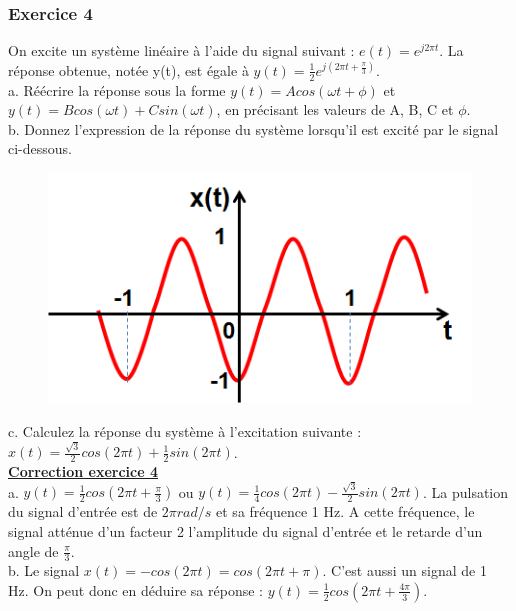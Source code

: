 \documentclass[11pt]{report}
\begin{document}
 	
 	
 	
 	
 	
 	\subsubsection{Exercice 4}
 	
 	On excite un système linéaire à l'aide du signal suivant : $e(t)=e^{j2\pi t}$. La réponse obtenue, notée y(t), est égale à $y(t)=\frac{1}{2}e^{j(2\pi t+\frac{\pi}{3})}$.\\
 	
 	a. Réécrire la réponse sous la forme $y(t)=Acos(\omega t + \phi)$ et $y(t)=Bcos(\omega t)+Csin(\omega t)$, en précisant les valeurs de A, B, C et $\phi$.\\
 	
 	b. Donnez l'expression de la réponse du système lorsqu'il est excité par le signal ci-dessous.
 	
 	\begin{figure}[h!]
 		\centering
 		\includegraphics[scale=0.5]{images/Exo_2_4.png} 
 	\end{figure} 
 	
 	c. Calculez la réponse du système à l'excitation suivante : $x(t)=\frac{\sqrt{3}}{2}cos(2\pi t)+\frac{1}{2}sin(2\pi t)$.\\
 	
 	
 	\textbf{\underline{Correction exercice 4}}\\
 	
 	a. $y(t)=\frac{1}{2}cos(2\pi t+\frac{\pi}{3})$ ou $y(t)=\frac{1}{4}cos(2\pi t)-\frac{\sqrt{3}}{2}sin(2\pi t)$. La pulsation du signal d'entrée est de $2\pi rad/s$ et sa fréquence 1 Hz. A cette fréquence, le signal atténue d'un facteur 2 l'amplitude du signal d'entrée et le retarde d'un angle de $\frac{\pi}{3}$.\\
 	
 	b. Le signal $x(t)=-cos(2\pi t)=cos(2\pi t+\pi)$. C'est aussi un signal de 1 Hz. On peut donc en déduire sa réponse : $y(t)=\frac{1}{2}cos(2\pi t+\frac{4\pi}{3})$.\\
 	
\end{document}
